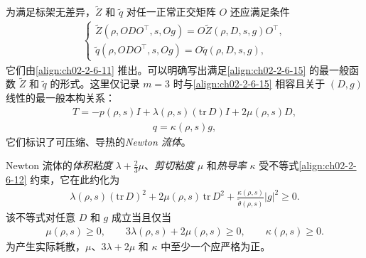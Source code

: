 \documentclass[../../main.tex]{subfiles}
\begin{document}
为满足标架无差异，$\tilde{Z}$ 和 $\tilde{q}$ 对任一正常正交矩阵 $O$ 还应满足条件
\begin{align}
\begin{cases}
\tilde{Z}(\rho,ODO^{\top},s,Og)=O\tilde{Z}(\rho,D,s,g)O^{\top},\\
\tilde{q}(\rho,ODO^{\top},s,Og)=O\tilde{q}(\rho,D,s,g),
\end{cases}
\label{align:ch02-2-6-15}
\end{align}
它们由\eqref{align:ch02-2-6-11} 推出。可以明确写出满足\eqref{align:ch02-2-6-15} 的最一般函数 $\tilde{Z}$ 和 $\tilde{q}$ 的形式。这里仅记录 $m=3$ 时与\eqref{align:ch02-2-6-15} 相容且关于 $(D,g)$ 线性的最一般本构关系：
\begin{align}
T=-p(\rho,s)I+\lambda(\rho,s)(\mathrm{tr}\,D)I+2\mu(\rho,s)D,
\label{align:ch02-2-6-16}
\end{align}
\begin{align}
q=\kappa(\rho,s)g,
\label{align:ch02-2-6-17}
\end{align}
它们标识了可压缩、导热的\emph{Newton 流体}。

Newton 流体的\emph{体积粘度} $\lambda+\tfrac{2}{3}\mu$、\emph{剪切粘度} $\mu$ 和\emph{热导率} $\kappa$ 受不等式\eqref{align:ch02-2-6-12} 约束，它在此约化为
\begin{align}
\lambda(\rho,s)(\mathrm{tr}\,D)^{2}+2\mu(\rho,s)\,\mathrm{tr}\,D^{2}+\frac{\kappa(\rho,s)}{\tilde{\theta}(\rho,s)}|g|^{2}\geqslant 0.
\label{align:ch02-2-6-18}
\end{align}
该不等式对任意 $D$ 和 $g$ 成立当且仅当
\begin{align}
\mu(\rho,s)\geqslant 0,\qquad 3\lambda(\rho,s)+2\mu(\rho,s)\geqslant 0,\qquad\kappa(\rho,s)\geqslant 0.
\label{align:ch02-2-6-19}
\end{align}
为产生实际耗散，$\mu$、$3\lambda+2\mu$ 和 $\kappa$ 中至少一个应严格为正。
\end{document}
